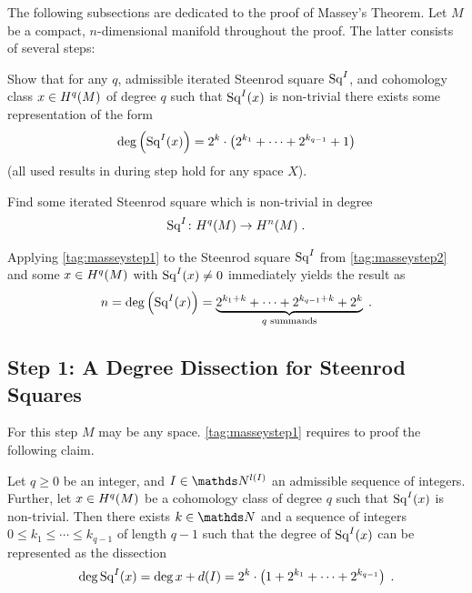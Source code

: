 The following subsections are dedicated to the proof of Massey's Theorem.
Let $M$ be a compact, $n$-dimensional manifold throughout the proof.
The latter consists of several steps:
\begin{steps}
\item\label{tag:masseystep1} 
  Show that for any $q$, admissible iterated Steenrod square $\mathrm{Sq}^{I}$, and cohomology
  class $x\in H^q(M)$ of degree $q$ such that $\mathrm{Sq}^{I}(x)$ is non-trivial there exists
  some representation of the form
  \begin{gather*}
    \deg \left(\mathrm{Sq}^{I}(x)\right)
    = 2^k\cdot
    \left( 2^{k_1}+\dotsb+2^{k_{q-1}} + 1 \right)
  \end{gather*}
  (all used results in during step hold for any space $X$).
\item\label{tag:masseystep2}
  Find some iterated Steenrod square which is non-trivial in degree
  \begin{gather*}
    \mathrm{Sq}^{I}\colon H^q(M)\to H^n(M)
    \;.
  \end{gather*}
\end{steps}
Applying \ref{tag:masseystep1} to the Steenrod square $\mathrm{Sq}^{I}$ from
\ref{tag:masseystep2} and some $x\in H^q(M)$ with $\mathrm{Sq}^{I}(x)\neq 0$
immediately yields the result as
\begin{gather*}
  n = \deg\left(\mathrm{Sq}^{I}(x)\right) = \underbrace
  {2^{k_1+k}+\dotsb+2^{k_{q-1}+k} + 2^{k}}_{\text{$q$ summands}}
  \;.
\end{gather*}

\subsection[Degree Dissection for Steenrod Squares]
{Step 1: A Degree Dissection for Steenrod Squares}
For this step $M$ may be any space.
\ref{tag:masseystep1} requires to proof the following claim.
\begin{Lem}[\ref{tag:masseystep1}]\label{lem:masseystep1}
  Let $q\geq 0$ be an integer,
  and $I\in\Nat^{\l(I)}$ an admissible sequence of integers.
  Further, let $x\in H^q(M)$ be a cohomology class of degree $q$
  such that $\mathrm{Sq}^{I}(x)$ is non-trivial.
  Then there exists $k\in\Nat$ and a sequence of integers
  $0\leq k_1\leq\dotsb\leq k_{q-1}$ of length $q-1$ such that the
  degree of $\mathrm{Sq}^{I}(x)$ can be represented as the dissection
  \begin{gather*}
    \deg \mathrm{Sq}^{I}(x)
    = \deg x + d(I)
    = 2^k\cdot
    \left( 1 + 2^{k_1}+\dotsb+2^{k_{q-1}} \right)
    \;.
  \end{gather*}
\end{Lem}

